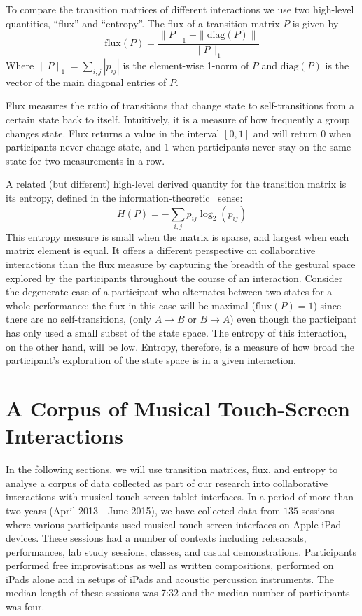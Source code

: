 \documentclass{sigchi}
\begin{document}
To compare the transition matrices of different interactions we use
two high-level quantities, ``flux'' and ``entropy''. The flux of a
transition matrix $P$ is given by
\begin{equation}
  \mathrm{flux}(P) = \frac{\|P\|_1-\|\mathrm{diag}(P)\|}{\|P\|_1}
\end{equation}
Where $\|P\|_1 = \sum_{i,j}|p_{ij}|$ is the element-wise 1-norm of $P$
and $\mathrm{diag}(P)$ is the vector of the main diagonal entries of
$P$.

Flux measures the ratio of transitions that change
state to self-transitions from a certain state back to itself.
Intuitively, it is a measure of how frequently a group changes state. Flux
returns a value in the interval $[0,1]$ and will return 0 when
participants never change state, and 1 when participants never stay on
the same state for two measurements in a row.

A related (but different) high-level derived quantity for the
transition matrix is its entropy, defined in the
information-theoretic~\cite{Shannon:1948rt} sense:
\begin{equation}
  H(P) = -\sum_{i,j}p_{ij}\log_2(p_{ij})
\end{equation}
This entropy measure is small when the matrix is sparse, and largest
when each matrix element is equal. It offers a different perspective
on collaborative interactions than the flux measure by capturing the
breadth of the gestural space explored by the participants throughout
the course of an interaction. Consider the degenerate case of a
participant who alternates between two states for a whole performance:
the flux in this case will be maximal ($\mathrm{flux}(P) = 1$) since
there are no self-transitions, (only $A \rightarrow B$ or
$ B \rightarrow A$) even though the participant has only used a small
subset of the state space. The entropy of this interaction,
on the other hand, will be low. Entropy, therefore, is a measure of
how broad the participant's exploration of the state space is in a given
interaction.

\section{A Corpus of Musical Touch-Screen Interactions}

In the following sections, we will use transition matrices, flux, and
entropy to analyse a corpus of data collected as part of our research
into collaborative interactions with musical touch-screen tablet
interfaces. In a period of more than two years (April 2013 - June 2015), we have
collected data from $135$ sessions where various participants used
musical touch-screen interfaces on Apple iPad devices. These sessions
had a number of contexts including rehearsals, performances, lab study
sessions, classes, and casual demonstrations. Participants performed
free improvisations as well as written compositions, performed on
iPads alone and in setups of iPads and acoustic percussion
instruments. The median length of these sessions was 7:32 and the
median number of participants was four.
\end{document}
